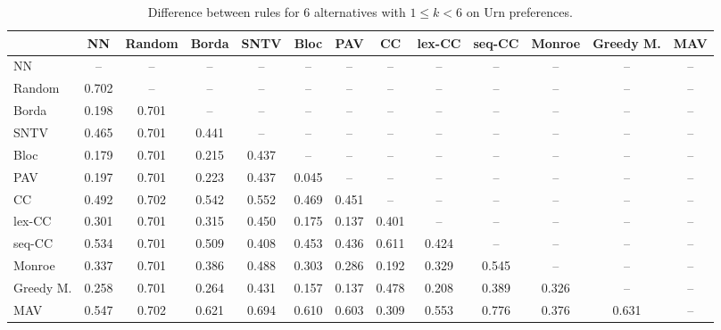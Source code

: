 
\begin{table*}[h!]
\centering
\begin{tabular}{lcccccccccccc}
\toprule
 & NN & Random & Borda & SNTV & Bloc & PAV & CC & lex-CC & seq-CC & Monroe & Greedy M. & MAV \\
\midrule
NN & -- & -- & -- & -- & -- & -- & -- & -- & -- & -- & -- & -- \\
Random & 0.702 & -- & -- & -- & -- & -- & -- & -- & -- & -- & -- & -- \\
Borda & 0.198 & 0.701 & -- & -- & -- & -- & -- & -- & -- & -- & -- & -- \\
SNTV & 0.465 & 0.701 & 0.441 & -- & -- & -- & -- & -- & -- & -- & -- & -- \\
Bloc & 0.179 & 0.701 & 0.215 & 0.437 & -- & -- & -- & -- & -- & -- & -- & -- \\
PAV & 0.197 & 0.701 & 0.223 & 0.437 & 0.045 & -- & -- & -- & -- & -- & -- & -- \\
CC & 0.492 & 0.702 & 0.542 & 0.552 & 0.469 & 0.451 & -- & -- & -- & -- & -- & -- \\
lex-CC & 0.301 & 0.701 & 0.315 & 0.450 & 0.175 & 0.137 & 0.401 & -- & -- & -- & -- & -- \\
seq-CC & 0.534 & 0.701 & 0.509 & 0.408 & 0.453 & 0.436 & 0.611 & 0.424 & -- & -- & -- & -- \\
Monroe & 0.337 & 0.701 & 0.386 & 0.488 & 0.303 & 0.286 & 0.192 & 0.329 & 0.545 & -- & -- & -- \\
Greedy M. & 0.258 & 0.701 & 0.264 & 0.431 & 0.157 & 0.137 & 0.478 & 0.208 & 0.389 & 0.326 & -- & -- \\
MAV & 0.547 & 0.702 & 0.621 & 0.694 & 0.610 & 0.603 & 0.309 & 0.553 & 0.776 & 0.376 & 0.631 & -- \\
\bottomrule
\end{tabular}

\caption{Difference between rules for 6 alternatives with $1 \leq k < 6$ on Urn preferences.}
\end{table*}

